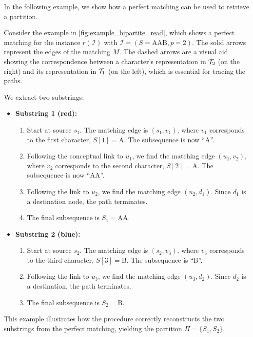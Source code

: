 In the following example, we show how a perfect matching can be used to retrieve a partition.
\begin{example}
    Consider the example in \cref{fig:example_bipartite_read}, which shows a perfect matching for the instance $r(\mathcal{I})$ with $\mathcal{I}=(S=\text{AAB}, p=2)$. The solid arrows represent the edges of the matching $M$. The dashed arrows are a visual aid showing the correspondence between a character's representation in $\mathcal{T}_{2}$ (on the right) and its representation in $\mathcal{T}_{1}$ (on the left), which is essential for tracing the paths.

    We extract two substrings:

    \begin{itemize}
        \item \textbf{Substring 1 (red):}
        \begin{enumerate}
            \item Start at source $s_1$. The matching edge is $(s_1, v_1)$, where $v_1$ corresponds to the first character, $S[1] = \text{A}$. The subsequence is now ``A''.
            \item Following the conceptual link to $u_1$, we find the matching edge $(u_1, v_2)$, where $v_2$ corresponds to the second character, $S[2] = \text{A}$. The subsequence is now ``AA''.
            \item Following the link to $u_2$, we find the matching edge $(u_2, d_1)$. Since $d_1$ is a destination node, the path terminates.
            \item The final subsequence is $S_1 = \text{AA}$.
        \end{enumerate}

        \item \textbf{Substring 2 (blue):}
        \begin{enumerate}
            \item Start at source $s_2$. The matching edge is $(s_2, v_3)$, where $v_3$ corresponds to the third character, $S[3] = \text{B}$. The subsequence is ``B''.
            \item Following the link to $u_3$, we find the matching edge $(u_3, d_2)$. Since $d_2$ is a destination, the path terminates.
            \item The final subsequence is $S_2 = \text{B}$.
        \end{enumerate}
    \end{itemize}
    This example illustrates how the procedure correctly reconstructs the two substrings from the perfect matching, yielding the partition $\Pi = \{S_1, S_2\}$.
    \begin{figure}[H]
        \centering
\end{figure}
\end{example}

